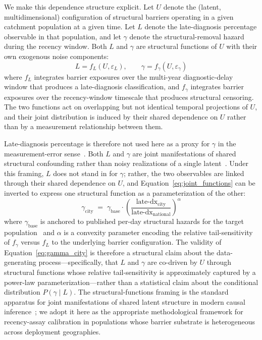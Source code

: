 \documentclass[11pt]{article}
\begin{document}
We make this dependence structure explicit. Let $U$ denote the (latent, multidimensional) configuration of structural barriers operating in a given catchment population at a given time. Let $L$ denote the late-diagnosis percentage observable in that population, and let $\gamma$ denote the structural-removal hazard during the recency window. Both $L$ and $\gamma$ are structural functions of $U$ with their own exogenous noise components:
\begin{equation}
L = f_L(U, \varepsilon_L), \qquad \gamma = f_\gamma(U, \varepsilon_\gamma) \label{eq:joint_functions}
\end{equation}
where $f_L$ integrates barrier exposures over the multi-year diagnostic-delay window that produces a late-diagnosis classification, and $f_\gamma$ integrates barrier exposures over the recency-window timescale that produces structural censoring. The two functions act on overlapping but not identical temporal projections of $U$, and their joint distribution is induced by their shared dependence on $U$ rather than by a measurement relationship between them.

Late-diagnosis percentage is therefore not used here as a proxy for $\gamma$ in the measurement-error sense~\cite{kuroki2014}. Both $L$ and $\gamma$ are joint manifestations of shared structural confounding rather than noisy realizations of a single latent~\cite{wang2021proxy,miao2018}. Under this framing, $L$ does not stand in for $\gamma$; rather, the two observables are linked through their shared dependence on $U$, and Equation~\ref{eq:joint_functions} can be inverted to express one structural function as a parameterization of the other:
\begin{equation}
\gamma_{\mathrm{city}} \;=\; \gamma_{\mathrm{base}} \cdot \left(\frac{\text{late-dx}_{\mathrm{city}}}{\text{late-dx}_{\mathrm{national}}}\right)^\alpha \label{eq:gamma_city}
\end{equation}
where $\gamma_{\mathrm{base}}$ is anchored to published per-day structural hazards for the target population~\cite{nhbs2023,cdcatp2023,bjs2023} and $\alpha$ is a convexity parameter encoding the relative tail-sensitivity of $f_\gamma$ versus $f_L$ to the underlying barrier configuration. The validity of Equation~\ref{eq:gamma_city} is therefore a structural claim about the data-generating process---specifically, that $L$ and $\gamma$ are co-driven by $U$ through structural functions whose relative tail-sensitivity is approximately captured by a power-law parameterization---rather than a statistical claim about the conditional distribution $P(\gamma \mid L)$. The structural-functions framing is the standard apparatus for joint manifestations of shared latent structure in modern causal inference~\cite{tchetgen2020proximal,pearl2009}; we adopt it here as the appropriate methodological framework for recency-assay calibration in populations whose barrier substrate is heterogeneous across deployment geographies.
\end{document}
